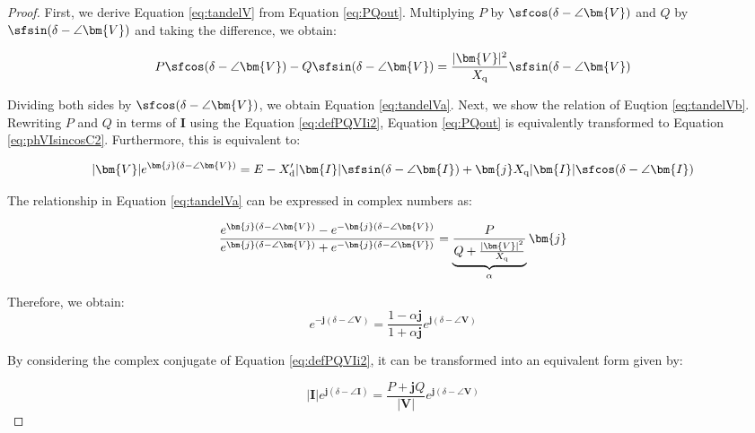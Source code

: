 \documentclass[graybox, envcountchap]{svmult}
\begin{document}
\begin{proof}
First, we derive Equation \ref{eq:tandelV} from Equation \ref{eq:PQout}.
Multiplying $P$ by $\sfcos (\delta - \angle \bm{V})$ and $Q$ by $\sfsin (\delta
- \angle \bm{V})$ and taking the difference, we obtain:

\begin{equation*}
  P \sfcos (\delta - \angle \bm{V}) - Q \sfsin (\delta - \angle \bm{V})
  = \frac{|\bm{V}|^2}{X_{\rm q}} \sfsin (\delta - \angle \bm{V}) 
\end{equation*}

Dividing both sides by $\sfcos (\delta - \angle \bm{V})$, we obtain Equation
\ref{eq:tandelVa}.  Next, we show the relation of Euqtion \ref{eq:tandelVb}.
Rewriting $P$ and $Q$ in terms of $\bm{I}$ using the Equation
\ref{eq:defPQVIi2}, Equation \ref{eq:PQout} is equivalently transformed to
Equation \ref{eq:phVIsincosC2}. Furthermore, this is equivalent to:

\begin{equation}\label{eq:tmpVE}
  |\bm{V}|e^{\bm{j}(\delta - \angle \bm{V})}=E
  -X_{\rm d}' |\bm{I}| \sfsin (\delta - \angle \bm{I})
  + 
  \bm{j} X_{\rm q} 
  |\bm{I}| \sfcos (\delta - \angle \bm{I})
\end{equation}

The relationship in Equation \ref{eq:tandelVa} can be expressed in complex
numbers as:

\begin{equation*}
  \frac{ e^{\bm{j}(\delta - \angle \bm{V})} - e^{-\bm{j}(\delta - \angle \bm{V})}}
  {e^{\bm{j}(\delta - \angle \bm{V})} + e^{-\bm{j}(\delta - \angle \bm{V})}}
  = 
  \underbrace{
  \frac{P}{Q + \tfrac{ |\bm{V}|^2}{X_{\rm q}} }
  }_{\alpha}
  \bm{j}
\end{equation*}

Therefore, we obtain:
\begin{equation*}
  e^{-\bm{j}(\delta - \angle \bm{V})} = \frac{1-\alpha \bm{j}}{1+\alpha \bm{j}}
  e^{\bm{j}(\delta - \angle \bm{V})}
\end{equation*}

By considering the complex conjugate of Equation \ref{eq:defPQVIi2}, it can be
transformed into an equivalent form given by:

\begin{equation}\label{eq:IVPQ}
  |\bm{I}|e^{\bm{j}(\delta - \angle \bm{I})} = \frac{P+\bm{j}Q}{|\bm{V}|}  
  e^{\bm{j}(\delta - \angle \bm{V})}
\end{equation}


\end{proof}
\end{document}

